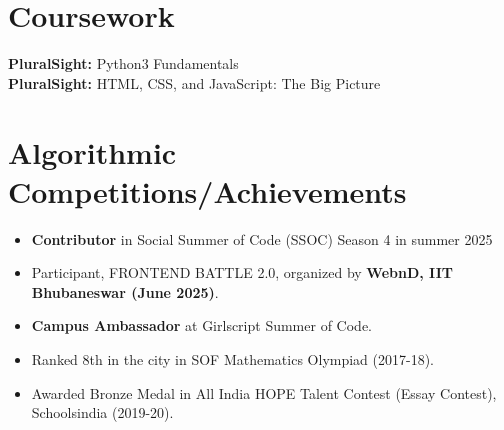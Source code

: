 \documentclass[letterpaper,11pt]{article}
\newcommand{\resumeItem}[1]{
  \item\small{
    {#1 \vspace{-2pt}}
  }
}
\newcommand{\resumeItemListStart}{\begin{itemize}}
\newcommand{\resumeItemListEnd}{\end{itemize}\vspace{-5pt}}
\begin{document}
\section{ Coursework}
\begin{itemize}[leftmargin=0.15in, label={}]
\small{\item{
       
        \textbf{PluralSight:} Python3 Fundamentals \\
        \textbf{PluralSight:} HTML, CSS, and JavaScript: The Big Picture\\
        
    }}

\end{itemize}

\section{Algorithmic Competitions/Achievements}
\resumeItemListStart
  \resumeItem{\textbf{Contributor} in Social Summer of Code (SSOC) Season 4 in summer 2025 }
  \resumeItem{Participant, FRONTEND BATTLE 2.0, organized by \textbf{WebnD, IIT Bhubaneswar (June 2025)}.}
  \resumeItem{\textbf{Campus Ambassador} at Girlscript Summer of Code.}
  \resumeItem{Ranked 8th in the city in SOF Mathematics Olympiad (2017-18).}
  \resumeItem{Awarded Bronze Medal in All India HOPE Talent Contest (Essay Contest), Schoolsindia (2019-20).}
\resumeItemListEnd



\end{document}
